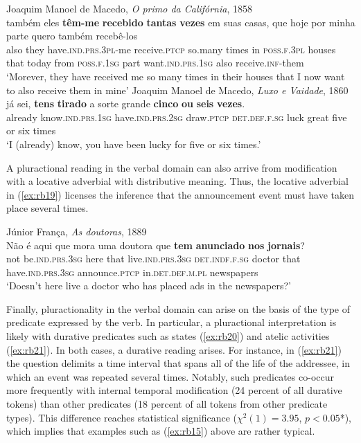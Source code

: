 \documentclass[output=paper,colorlinks,citecolor=brown]{langscibook}
\begin{document}
\ea\label{ex:rb17}
Joaquim Manoel de Macedo, \textit{O primo da Califórnia}, 1858\\
\gll também eles \textbf{têm-me} \textbf{recebido} \textbf{tantas} \textbf{vezes} em suas casas, que hoje por minha parte quero também recebê-los\\
also they have.\textsc{ind.prs.3pl}-me receive.\textsc{ptcp} so.many times in \textsc{poss.f.3pl} houses that today from \textsc{poss.f.1sg} part want.\textsc{ind.prs.1sg} also receive.\textsc{inf}-them\\
\glt ‘Morever, they have received me so many times in their houses that I now want to also receive them in mine’
\ex\label{ex:rb18}
Joaquim Manoel de Macedo, \textit{Luxo e Vaidade}, 1860\\
\gll já sei, \textbf{tens} \textbf{tirado} a sorte grande \textbf{cinco} \textbf{ou} \textbf{seis} \textbf{vezes}.\\
already know.\textsc{ind.prs.1sg} have.\textsc{ind.prs.2sg} draw.\textsc{ptcp} \textsc{det.def.f.sg} luck great five or six times\\
\glt ‘I (already) know, you have been lucky for five or six times.’
\z

A pluractional reading in the verbal domain can also arrive from modification with a locative adverbial with distributive meaning. Thus, the locative adverbial in (\ref{ex:rb19}) licenses the inference that the announcement event must have taken place several times.

\ea\label{ex:rb19}
Júnior França, \textit{As doutoras}, 1889\\
\gll Não é aqui que mora uma doutora que \textbf{tem} \textbf{anunciado} \textbf{nos} \textbf{jornais}?\\
not be.\textsc{ind.prs.3sg} here that live.\textsc{ind.prs.3sg} \textsc{det.indf.f.sg} doctor that have.\textsc{ind.prs.3sg} announce.\textsc{ptcp} in.\textsc{det.def.m.pl} newspapers\\
\glt ‘Doesn’t here live a doctor who has placed ads in the newspapers?’
\z


Finally, pluractionality in the verbal domain can arise on the basis of the type of predicate expressed by the verb. In particular, a pluractional interpretation is likely with durative predicates such as states (\ref{ex:rb20}) and atelic activities (\ref{ex:rb21}). In both cases, a durative reading arises. For instance, in (\ref{ex:rb21}) the question delimits a time interval that spans all of the life of the addressee, in which an event was repeated several times. Notably, such predicates co-occur more frequently with internal temporal modification (24 percent of all durative tokens) than other predicates (18 percent of all tokens from other predicate types). This difference reaches statistical significance ($\chi^2(1)=3.95$, $p<0.05$*), which implies that examples such as (\ref{ex:rb15}) above are rather typical.
\end{document}
